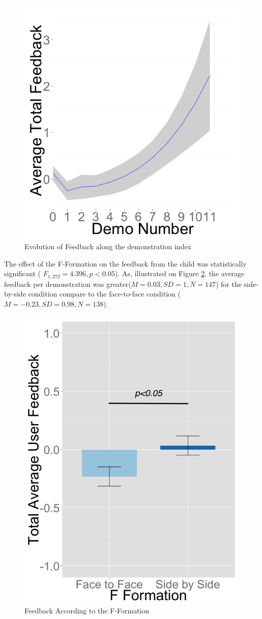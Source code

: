 \documentclass[letterpaper, 10 pt, conference]{ieeeconf}  %
\begin{document}
  \begin{figure}
  	\centering
  	\includegraphics[width=0.8\linewidth]{figures/plots/evoldemo}
  	\caption{Evolution of Feedback along the demonstration index}
  	\label{fig:uf_nb}
  \end{figure}
 
 The effect of the F-Formation on the feedback from the child was statistically significant ( $F_{1,272}= 4.396, p<0.05$). As, illustrated on Figure \ref{fig:userfeedback_fformation_se}, the average feedback per demonstration was greater($M=0.03, SD=1, N=147$) for the side-by-side condition compare to the face-to-face condition ($M=-0.23, SD=0.98, N=138$).
 \begin{figure}
 	\centering
 	\includegraphics[width=0.6\linewidth]{figures/plots/userfeedback_fformation_se}
 	\caption{Feedback According to the F-Formation}
 	\label{fig:userfeedback_fformation_se}
 \end{figure}
\end{document}
